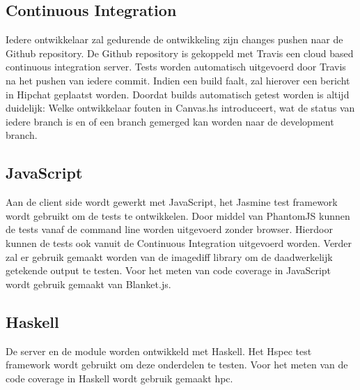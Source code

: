 \subsection{Continuous Integration}
Iedere ontwikkelaar zal gedurende de ontwikkeling zijn changes pushen naar de Github repository. De Github repository is gekoppeld met Travis een cloud based continuous integration server. Tests worden automatisch uitgevoerd door Travis na het pushen van iedere commit. Indien een build faalt, zal hierover een bericht in Hipchat geplaatst worden. Doordat builds automatisch getest worden is altijd duidelijk: Welke ontwikkelaar fouten in Canvas.hs introduceert, wat de status van iedere branch is en of een branch gemerged kan worden naar de development branch.

\subsection{JavaScript}
Aan de client side wordt gewerkt met JavaScript, het Jasmine test framework wordt gebruikt om de tests te ontwikkelen. Door middel van PhantomJS kunnen de tests vanaf de command line worden uitgevoerd zonder browser. Hierdoor kunnen de tests ook vanuit de Continuous Integration uitgevoerd worden. Verder zal er gebruik gemaakt worden van de imagediff library om de daadwerkelijk getekende output te testen. Voor het meten van code coverage in JavaScript wordt gebruik gemaakt van Blanket.js.

\subsection{Haskell}
De server en de module worden ontwikkeld met Haskell. Het Hspec test framework wordt gebruikt om deze onderdelen te testen. Voor het meten van de code coverage in Haskell wordt gebruik gemaakt hpc.
